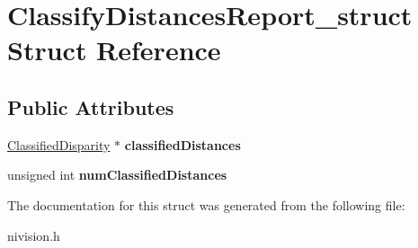 \hypertarget{structClassifyDistancesReport__struct}{
\section{ClassifyDistancesReport\_\-struct Struct Reference}
\label{structClassifyDistancesReport__struct}
}
\subsection*{Public Attributes}
\begin{DoxyCompactItemize}
\item 
\hypertarget{structClassifyDistancesReport__struct_a01402492e11ed00d46dd70a7518702a8}{
\hyperlink{structClassifiedDisparity__struct}{ClassifiedDisparity} $\ast$ {\bfseries classifiedDistances}}
\label{structClassifyDistancesReport__struct_a01402492e11ed00d46dd70a7518702a8}

\item 
\hypertarget{structClassifyDistancesReport__struct_a574d0590ef2e80a9ef9ee71743ec6b0f}{
unsigned int {\bfseries numClassifiedDistances}}
\label{structClassifyDistancesReport__struct_a574d0590ef2e80a9ef9ee71743ec6b0f}

\end{DoxyCompactItemize}


The documentation for this struct was generated from the following file:\begin{DoxyCompactItemize}
\item 
nivision.h\end{DoxyCompactItemize}
